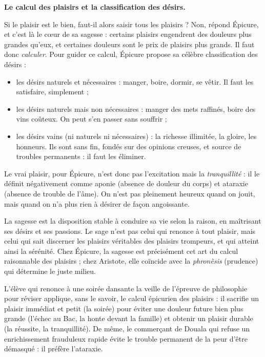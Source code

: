 \documentclass[11pt]{article}
\newcommand{\cle}[1]{{\popxbold\color{popdark}#1}}
\begin{document}
\textbf{Le calcul des plaisirs et la classification des désirs.}\par
Si le plaisir est le bien, faut-il alors saisir tous les plaisirs ? Non, répond Épicure, et c'est là le cœur de sa sagesse : certains plaisirs engendrent des douleurs plus grandes qu'eux, et certaines douleurs sont le prix de plaisirs plus grands. Il faut donc \emph{calculer}. Pour guider ce calcul, Épicure propose sa célèbre classification des désirs :

\begin{itemize}
\item les désirs \cle{naturels et nécessaires} : manger, boire, dormir, se vêtir. Il faut les satisfaire, simplement ;
\item les désirs \cle{naturels mais non nécessaires} : manger des mets raffinés, boire des vins coûteux. On peut s'en passer sans souffrir ;
\item les désirs \cle{vains} (ni naturels ni nécessaires) : la richesse illimitée, la gloire, les honneurs. Ils sont sans fin, fondés sur des opinions creuses, et source de troubles permanents : il faut les éliminer.
\end{itemize}

Le vrai plaisir, pour Épicure, n'est donc pas l'excitation mais la \emph{tranquillité} : il le définit négativement comme \cle{aponie} (absence de douleur du corps) et \cle{ataraxie} (absence de trouble de l'âme). On n'est pas pleinement heureux quand on jouit, mais quand on n'a plus rien à désirer de façon angoissante.

\begin{definition}[La sagesse]
La \cle{sagesse} est la disposition stable à conduire sa vie selon la raison, en maîtrisant ses désirs et ses passions. Le sage n'est pas celui qui renonce à tout plaisir, mais celui qui sait discerner les plaisirs véritables des plaisirs trompeurs, et qui atteint ainsi la sérénité. Chez Épicure, la sagesse est précisément cet art du calcul raisonnable des plaisirs ; chez Aristote, elle coïncide avec la \emph{phronèsis} (prudence) qui détermine le juste milieu.
\end{definition}

\begin{exemplebox}
L'élève qui renonce à une soirée dansante la veille de l'épreuve de philosophie pour réviser applique, sans le savoir, le calcul épicurien des plaisirs : il sacrifie un plaisir immédiat et petit (la soirée) pour éviter une douleur future bien plus grande (l'échec au Bac, la honte devant la famille) et obtenir un plaisir durable (la réussite, la tranquillité). De même, le commerçant de Douala qui refuse un enrichissement frauduleux rapide évite le trouble permanent de la peur d'être démasqué : il préfère l'ataraxie.
\end{exemplebox}
\end{document}
